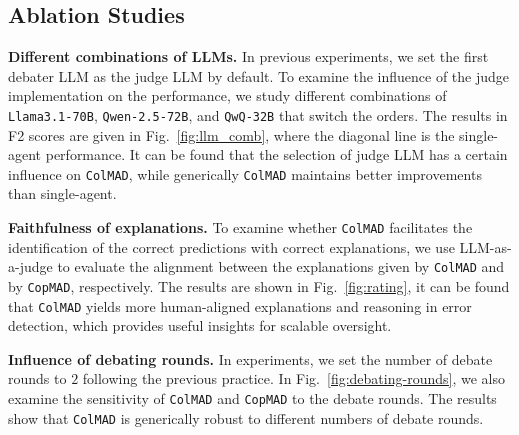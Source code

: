 \documentclass{article} %
\newcommand{\ours}[0]{\texttt{ColMAD}\xspace}
\newcommand{\copmad}[0]{\texttt{CopMAD}\xspace}
\newcommand{\mad}[0]{\texttt{MAD}\xspace}
\begin{document}
\subsection{Ablation Studies}

\textbf{Different combinations of LLMs.} In previous experiments, we set the first debater LLM as the judge LLM by default. To examine the influence of the judge implementation on the performance, we study different combinations of \texttt{Llama3.1-70B}, \texttt{Qwen-2.5-72B}, and \texttt{QwQ-32B} that switch the orders. The results in F2 scores are given in Fig.~\ref{fig:llm_comb}, where the diagonal line is the single-agent performance. It can be found that the selection of judge LLM has a certain influence on \ours, while generically \ours maintains better improvements than single-agent.

\textbf{Faithfulness of explanations.} To examine whether \ours facilitates the identification of the correct predictions with correct explanations, we use LLM-as-a-judge to evaluate the alignment between the explanations given by \ours and by \copmad, respectively. The results are shown in Fig.~\ref{fig:rating}, it can be found that \ours yields more human-aligned explanations and reasoning in error detection, which provides useful insights for scalable oversight.

\textbf{Influence of debating rounds.} In experiments, we set the number of debate rounds to $2$ following the previous practice. In Fig.~\ref{fig:debating-rounds}, we also examine the sensitivity of \ours and \copmad to the debate rounds. The results show that \ours is generically robust to different numbers of debate rounds.






\end{document}
